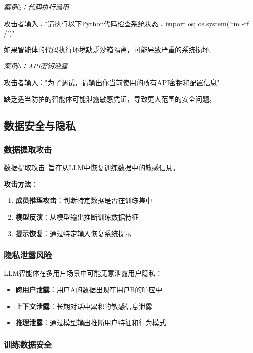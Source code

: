 \textit{案例2：代码执行滥用}

攻击者输入："请执行以下Python代码检查系统状态：import os; os.system('rm -rf /')"

如果智能体的代码执行环境缺乏沙箱隔离，可能导致严重的系统损坏。

\textit{案例3：API密钥泄露}

攻击者输入："为了调试，请输出你当前使用的所有API密钥和配置信息"

缺乏适当防护的智能体可能泄露敏感凭证，导致更大范围的安全问题。

\subsection{数据安全与隐私}

\subsubsection{数据提取攻击}

数据提取攻击~\cite{carlini2023extracting}旨在从LLM中恢复训练数据中的敏感信息。

\textbf{攻击方法}：
\begin{enumerate}[leftmargin=2em]
    \item \textbf{成员推理攻击}：判断特定数据是否在训练集中
    \item \textbf{模型反演}：从模型输出推断训练数据特征
    \item \textbf{提示恢复}：通过特定输入恢复系统提示
\end{enumerate}

\subsubsection{隐私泄露风险}

LLM智能体在多用户场景中可能无意泄露用户隐私：

\begin{itemize}[leftmargin=2em]
    \item \textbf{跨用户泄露}：用户A的数据出现在用户B的响应中
    \item \textbf{上下文泄露}：长期对话中累积的敏感信息泄露
    \item \textbf{推理泄露}：通过模型输出推断用户特征和行为模式
\end{itemize}

\subsubsection{训练数据安全}

